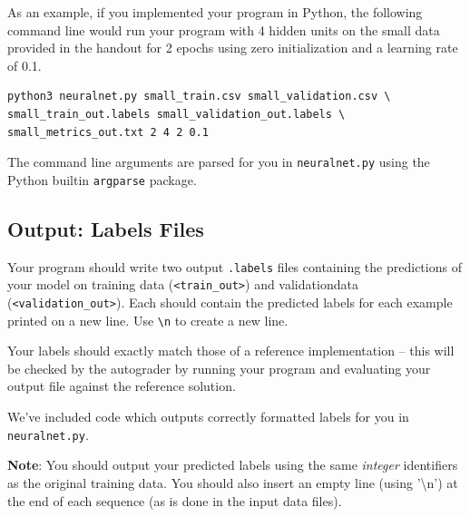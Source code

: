 \documentclass[11pt,addpoints,answers]{exam}
\begin{document}
As an example, if you implemented your program in Python, the following command line would run your program with 4 hidden units on the small data provided in the handout for 2 epochs using zero initialization and a learning rate of 0.1.
\\
\begin{lstlisting}[language=Shell]
python3 neuralnet.py small_train.csv small_validation.csv \
small_train_out.labels small_validation_out.labels \
small_metrics_out.txt 2 4 2 0.1 
\end{lstlisting}

The command line arguments are parsed for you in \texttt{neuralnet.py} using the Python builtin \texttt{argparse} package.

\subsection{Output: Labels Files} \label{output}
Your program should write two output \texttt{.labels} files containing the predictions of your model on training data (\texttt{<train\_out>}) and validation\thinspace data (\texttt{<validation\_out>}). Each should contain the predicted labels for each example printed on a new line. Use \lstinline{\n} to create a new line. 

Your labels should exactly match those of a reference implementation -- this will be checked by the autograder by running your program and evaluating your output file against the reference solution.

We've included code which outputs correctly formatted labels for you in \texttt{neuralnet.py}.

\textbf{Note}: You should output your predicted labels using the same \emph{integer} identifiers as the original training data. You should also insert an empty line (using ’\textbackslash n’) at the end of each sequence (as is done in the input data files).


\end{document}
